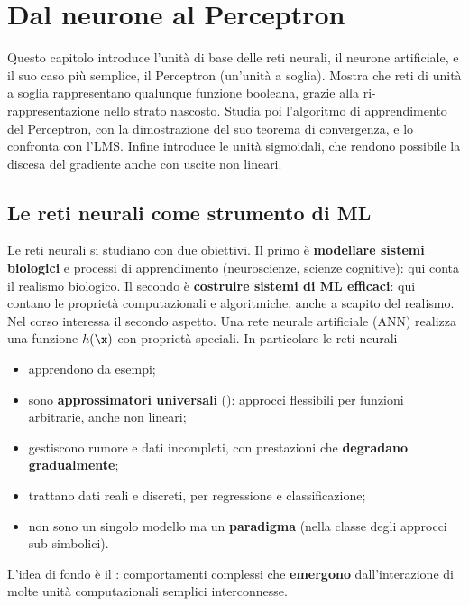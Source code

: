 \chapter{Dal neurone al Perceptron}
\label{cap:perceptron}

\begin{inbreve}
Questo capitolo introduce l'unità di base delle reti neurali, il neurone artificiale, e il suo caso più
semplice, il Perceptron (un'unità a soglia). Mostra che reti di unità a soglia rappresentano qualunque funzione
booleana, grazie alla ri-rappresentazione nello strato nascosto. Studia poi l'algoritmo di apprendimento del
Perceptron, con la dimostrazione del suo teorema di convergenza, e lo confronta con l'LMS. Infine introduce le
unità sigmoidali, che rendono possibile la discesa del gradiente anche con uscite non lineari.
\end{inbreve}

\section{Le reti neurali come strumento di ML}

Le reti neurali si studiano con due obiettivi. Il primo è \textbf{modellare sistemi biologici} e processi di
apprendimento (neuroscienze, scienze cognitive): qui conta il realismo biologico. Il secondo è \textbf{costruire
sistemi di ML efficaci}: qui contano le proprietà computazionali e algoritmiche, anche a scapito del realismo. Nel
corso interessa il secondo aspetto. Una rete neurale artificiale (ANN) realizza una funzione $h(\x)$ con proprietà
speciali. In particolare le reti neurali
\begin{itemize}
  \item apprendono da esempi;
  \item sono \textbf{approssimatori universali} (): approcci flessibili per
        funzioni arbitrarie, anche non lineari;
  \item gestiscono rumore e dati incompleti, con prestazioni che \textbf{degradano gradualmente};
  \item trattano dati reali e discreti, per regressione e classificazione;
  \item non sono un singolo modello ma un \textbf{paradigma} (nella classe degli approcci sub-simbolici).
\end{itemize}
L'idea di fondo è il : comportamenti complessi che \textbf{emergono} dall'interazione di
molte unità computazionali semplici interconnesse.

